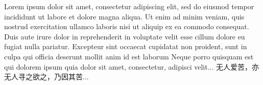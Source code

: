 \start\language[en]
\starttyping
Lorem ipsum dolor sit amet, consectetur adipiscing elit, 
sed do eiusmod tempor incididunt ut labore et dolore magna aliqua. 
Ut enim ad minim veniam, quis nostrud exercitation ullamco 
laboris nisi ut aliquip ex ea commodo consequat. 
Duis aute irure dolor in reprehenderit in voluptate velit 
esse cillum dolore eu fugiat nulla pariatur. 
Excepteur sint occaecat cupidatat non proident, sunt in 
culpa qui officia deserunt mollit anim id est laborum
Neque porro quisquam est qui dolorem ipsum quia dolor 
sit amet, consectetur, adipisci velit...
\stoptyping\stop
\start\language[hans]
\starttyping
无人爱苦，亦无人寻之欲之，乃因其苦...
\stoptyping\stop